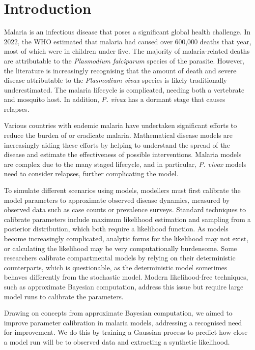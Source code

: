 \chapter{Introduction}

Malaria is an infectious disease that poses a significant global health 
challenge. In 2022, the WHO estimated that malaria had caused over 600,000 
deaths that year, most of which were in children under five. 
The majority of malaria-related deaths are attributable to the 
\textit{Plasmodium falciparum} species of the parasite. 
However, the literature is increasingly recognising that 
the amount of death and severe disease attributable to the 
\textit{Plasmodium vivax} species is 
likely traditionally underestimated. The malaria lifecycle is complicated, 
needing both a vertebrate and mosquito host. In addition, \textit{P. vivax} has 
a dormant stage that causes relapses. 

Various countries with endemic malaria have undertaken significant efforts to 
reduce the burden of or eradicate malaria. Mathematical disease models are 
increasingly aiding these efforts by helping to understand the spread of the 
disease and estimate the effectiveness of possible interventions. 
Malaria models are complex due to the many staged lifecycle, and in 
particular, \textit{P. vivax} models need to consider relapses, further 
complicating the model.

To simulate different scenarios using models, modellers must first calibrate
the model parameters to approximate observed disease dynamics, measured by
observed data such as case counts or prevalence surveys. Standard techniques
to calibrate parameters include maximum likelihood estimation and sampling
from a posterior distribution, which both require a likelihood function. As
models become increasingly complicated, analytic forms for the likelihood may
not exist, or calculating the likelihood may be very computationally
burdensome. Some researchers calibrate compartmental models by relying on
their deterministic counterparts, which is questionable, as the deterministic
model sometimes behaves differently from the stochastic model. Modern
likelihood-free techniques, such as approximate Bayesian computation, address
this issue but require large model runs to calibrate the parameters.

Drawing on concepts from approximate Bayesian computation, we aimed to improve
parameter calibration in malaria models, addressing a recognised need for
improvement. We do this by training a Gaussian process to predict how close a
model run will be to observed data and extracting a synthetic likelihood.

